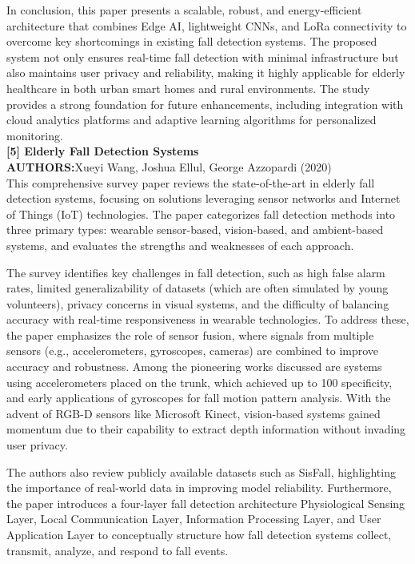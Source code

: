 \documentclass[a4paper, 12pt]{report}
\begin{document}
In conclusion, this paper presents a scalable, robust, and energy-efficient architecture that combines Edge AI, lightweight CNNs, and LoRa connectivity to overcome key shortcomings in existing fall detection systems. The proposed system not only ensures real-time fall detection with minimal infrastructure but also maintains user privacy and reliability, making it highly applicable for elderly healthcare in both urban smart homes and rural environments. The study provides a strong foundation for future enhancements, including integration with cloud analytics platforms and adaptive learning algorithms for personalized monitoring.\\
\noindent\textbf{[5] Elderly Fall Detection Systems}\\
\textbf{AUTHORS:}Xueyi Wang, Joshua Ellul, George Azzopardi (2020)\\
This comprehensive survey paper reviews the state-of-the-art in elderly fall detection systems, focusing on solutions leveraging sensor networks and Internet of Things (IoT) technologies. The paper categorizes fall detection methods into three primary types: wearable sensor-based, vision-based, and ambient-based systems, and evaluates the strengths and weaknesses of each approach.

The survey identifies key challenges in fall detection, such as high false alarm rates, limited generalizability of datasets (which are often simulated by young volunteers), privacy concerns in visual systems, and the difficulty of balancing accuracy with real-time responsiveness in wearable technologies. To address these, the paper emphasizes the role of sensor fusion, where signals from multiple sensors (e.g., accelerometers, gyroscopes, cameras) are combined to improve accuracy and robustness.
Among the pioneering works discussed are systems using accelerometers placed on the trunk, which achieved up to 100 specificity, and early applications of gyroscopes for fall motion pattern analysis. With the advent of RGB-D sensors like Microsoft Kinect, vision-based systems gained momentum due to their capability to extract depth information without invading user privacy.

The authors also review publicly available datasets such as SisFall, highlighting the importance of real-world data in improving model reliability. Furthermore, the paper introduces a four-layer fall detection architecture Physiological Sensing Layer, Local Communication Layer, Information Processing Layer, and User Application Layer to conceptually structure how fall detection systems collect, transmit, analyze, and respond to fall events.
\end{document}
